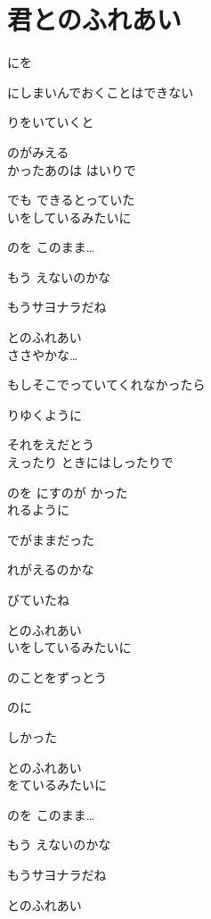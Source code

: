 \section{ 君とのふれあい}
\large{

にを 

にしまいんでおくことはできない

りをいていくと 

のがみえる
\\

かったあのは はいりで

でも できるとっていた
\\

いをしているみたいに

のを このまま…

もう えないのかな

もうサヨナラだね

とのふれあい
\\

ささやかな… 

もしそこでっていてくれなかったら

りゆくように 

それをえだとう
\\

えったり ときにはしったりで

のを にすのが かった
\\

れるように

でがままだった

れがえるのかな

びていたね

とのふれあい
\\

いをしているみたいに

のことをずっとう

のに

しかった

とのふれあい
\\

をているみたいに

のを このまま…

もう えないのかな

もうサヨナラだね

とのふれあい

}